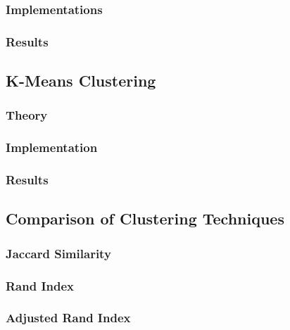 \documentclass[12pt]{article}
\begin{document}
\subsubsection{Implementations}

\subsubsection{Results}

\subsection{K-Means Clustering}
\subsubsection{Theory}

\subsubsection{Implementation}

\subsubsection{Results}

\subsection{Comparison of Clustering Techniques}
\subsubsection{Jaccard Similarity}

\subsubsection{Rand Index}

\subsubsection{Adjusted Rand Index}

\newpage
\printbibliography
\end{document}
